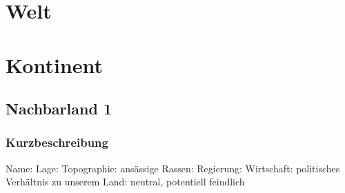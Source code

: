\chapter{Welt}
\chapter{Kontinent}
\section{Nachbarland 1}
\subsection{Kurzbeschreibung}
\begin{outline}
	\1 Name: 
	\1 Lage:
	\1 Topographie:
	\1 ansässige Rassen:
	\1 Regierung:
	\1 Wirtschaft:
	\1 politisches Verhältnis zu unserem Land: neutral, potentiell feindlich
\end{outline}

